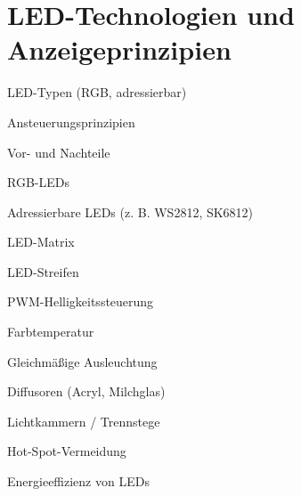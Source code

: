 \section{LED-Technologien und Anzeigeprinzipien} 
LED-Typen (RGB, adressierbar)

Ansteuerungsprinzipien

Vor- und Nachteile

RGB-LEDs

Adressierbare LEDs (z. B. WS2812, SK6812)

LED-Matrix

LED-Streifen

PWM-Helligkeitssteuerung

Farbtemperatur

Gleichmäßige Ausleuchtung

Diffusoren (Acryl, Milchglas)

Lichtkammern / Trennstege

Hot-Spot-Vermeidung

Energieeffizienz von LEDs